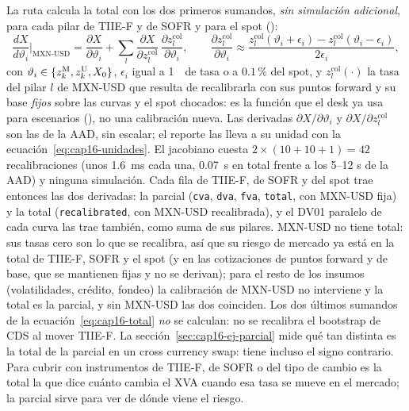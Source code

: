\begin{sloppypar}
La ruta calcula la total con los dos primeros sumandos, \emph{sin simulación adicional}, para cada pilar de TIIE-F y de
SOFR y para el spot ():
\begin{equation}\label{eq:cap16-total-api}
  \frac{dX}{d\vartheta_i}\bigg|_{\mathrm{MXN\text{-}USD}}=\frac{\partial X}{\partial\vartheta_i}
  +\sum_{l}\frac{\partial X}{\partial z^{\mathrm{col}}_l}\,\frac{\partial z^{\mathrm{col}}_l}{\partial\vartheta_i},\qquad
  \frac{\partial z^{\mathrm{col}}_l}{\partial\vartheta_i}\approx
  \frac{z^{\mathrm{col}}_l(\vartheta_i+\epsilon_i)-z^{\mathrm{col}}_l(\vartheta_i-\epsilon_i)}{2\epsilon_i},
\end{equation}
con $\vartheta_i\in\{z^{\mathrm M}_k,z^{\mathrm U}_k,X_0\}$, $\epsilon_i$ igual a 1~\pb\ de tasa o a $0.1\,\%$ del spot,
y $z^{\mathrm{col}}_l(\cdot)$ la tasa del pilar $l$ de MXN-USD que resulta de recalibrarla con sus puntos forward y su
base \emph{fijos} sobre las curvas y el spot chocados: es la función que el desk ya usa para escenarios
(), no una calibración nueva. Las derivadas
$\partial X/\partial\vartheta_i$ y $\partial X/\partial z^{\mathrm{col}}_l$ son las de la AAD, sin escalar; el reporte las
lleva a su unidad con la ecuación~\eqref{eq:cap16-unidades}. El jacobiano cuesta $2\times(10+10+1)=42$ recalibraciones
(unos 1.6~ms cada una, 0.07~s en total frente a los 5--12 s de la AAD) y ninguna simulación. Cada fila de TIIE-F, de SOFR
y del spot trae entonces las dos derivadas: la parcial (\texttt{cva}, \texttt{dva}, \texttt{fva}, \texttt{total}, con
MXN-USD fija) y la total (\texttt{recalibrated}, con MXN-USD recalibrada), y el DV01 paralelo de cada curva las trae
también, como suma de sus pilares. MXN-USD no tiene total: sus tasas cero son lo que se recalibra, así que su riesgo de
mercado ya está en la total de TIIE-F, SOFR y el spot (y en las cotizaciones de puntos forward y de base, que se
mantienen fijas y no se derivan); para el resto de los insumos (volatilidades, crédito, fondeo) la calibración de
MXN-USD no interviene y la total es la parcial, y sin MXN-USD las dos coinciden. Los dos últimos sumandos de la
ecuación~\eqref{eq:cap16-total} \emph{no} se calculan: no se recalibra el bootstrap de CDS al mover TIIE-F. La
sección~\ref{sec:cap16-ej-parcial} mide qué tan distinta es la total de la parcial en un cross currency swap: tiene
incluso el signo contrario. Para cubrir con instrumentos de TIIE-F, de SOFR o del tipo de cambio es la total la que
dice cuánto cambia el XVA cuando esa tasa se mueve en el mercado; la parcial sirve para ver de dónde viene el riesgo.


\end{sloppypar}
